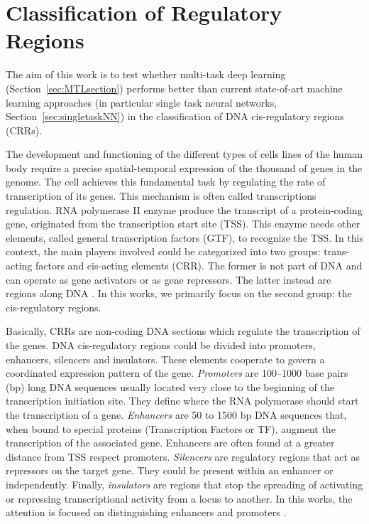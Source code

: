 \section{Classification of Regulatory Regions}
The aim of this work is to test whether multi-task deep learning (Section~\ref{sec:MTLsection}) performs better than current state-of-art
machine learning approaches (in particular single task neural networks, Section~\ref{sec:singletaskNN}) in the classification of DNA cis-regulatory regions (CRRs). 

The development and functioning of the different types of cells lines of the human body require a precise spatial-temporal expression of the thousand of genes in the genome. The cell achieves this fundamental task by regulating the rate of transcription of its genes. This mechanism is often called transcriptions regulation. 
RNA polymerase II enzyme produce the transcript of a protein-coding gene, originated from the transcription start site (TSS). This enzyme needs other elements, called general transcription factors (GTF), to recognize the TSS. In this context, the main players involved could be categorized into two groups: trans-acting factors and cis-acting elements (CRR). The former is not part of DNA and can operate as gene activators or as gene repressors. The latter instead are regions along DNA \cite{NarlikarRegulaotryelements}. In this works, we primarily focus on the second group: the cis-regulatory regions.

Basically, CRRs are non-coding DNA sections which
regulate the transcription of the genes. 
DNA cis-regulatory regions could be divided into promoters, enhancers, silencers and insulators. These elements cooperate to govern a coordinated expression pattern of the gene.  
\emph{Promoters} are 100–1000 base pairs (bp) long DNA sequences
usually located very close to the beginning of the transcription initiation site. They define where the RNA polymerase should start the transcription of a gene. 
\emph{Enhancers} are 50 to 1500 bp DNA sequences that, when bound to special proteins (Transcription Factors or TF), augment the transcription of the associated gene. Enhancers are often found at a greater distance from TSS respect promoters.
\emph{Silencers} are regulatory regions that act as repressors on the target gene. They could be present within an enhancer or independently. 
Finally, \emph{insulators} are regions that stop the spreading of activating or repressing transcriptional activity from a locus to another. In this works, the attention is focused on distinguishing enhancers and promoters \cite{NarlikarRegulaotryelements}. 

